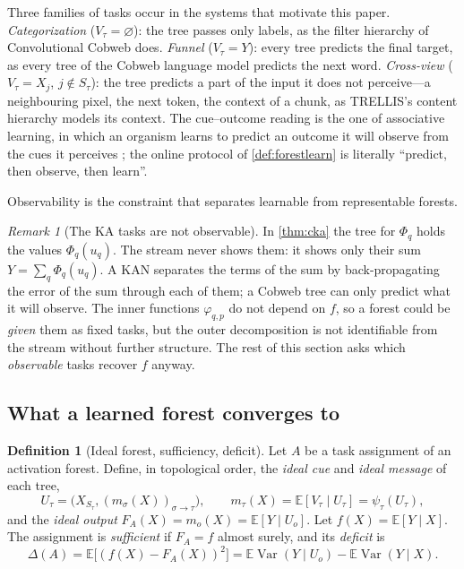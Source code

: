 \documentclass[11pt]{article}
\theoremstyle{definition}
\newtheorem{definition}[theorem]{Definition}
\theoremstyle{remark}
\newtheorem{remark}[theorem]{Remark}
\newcommand{\E}{\mathbb{E}}
\newcommand{\Var}{\operatorname{Var}}
\begin{document}
Three families of tasks occur in the systems that motivate this paper.
\emph{Categorization} ($V_\tau=\varnothing$): the tree passes only labels, as the filter
hierarchy of Convolutional Cobweb does.  \emph{Funnel} ($V_\tau=Y$): every tree predicts
the final target, as every tree of the Cobweb language model predicts the next word.
\emph{Cross-view} ($V_\tau=X_j$, $j\notin S_\tau$): the tree predicts a part of the input
it does not perceive---a neighbouring pixel, the next token, the context of a chunk, as
TRELLIS's content hierarchy models its context.  The cue--outcome reading is the one of
associative learning, in which an organism learns to predict an outcome it will observe
from the cues it perceives \citep{rescorla1972}; the online protocol of
\cref{def:forestlearn} is literally ``predict, then observe, then learn''.

Observability is the constraint that separates learnable from representable forests.

\begin{remark}[The KA tasks are not observable]\label{rem:kaobs}
In \cref{thm:cka} the tree for $\Phi_q$ holds the values $\Phi_q(u_q)$.  The stream
never shows them: it shows only their sum $Y=\sum_q\Phi_q(u_q)$.  A KAN separates the
terms of the sum by back-propagating the error of the sum through each of them; a Cobweb
tree can only predict what it will observe.  The inner functions $\varphi_{q,p}$ do not
depend on $f$, so a forest could be \emph{given} them as fixed tasks, but the outer
decomposition is not identifiable from the stream without further structure.  The rest
of this section asks which \emph{observable} tasks recover $f$ anyway.
\end{remark}

\subsection{What a learned forest converges to}

\begin{definition}[Ideal forest, sufficiency, deficit]\label{def:ideal}
Let $A$ be a task assignment of an activation forest.  Define, in topological order,
the \emph{ideal cue} and \emph{ideal message} of each tree,
\[
  U_\tau=\bigl(X_{S_\tau},(m_\sigma(X))_{\sigma\to\tau}\bigr),\qquad
  m_\tau(X)=\E[V_\tau\mid U_\tau]=\psi_\tau(U_\tau),
\]
and the \emph{ideal output} $F_A(X)=m_o(X)=\E[Y\mid U_o]$.  Let $f(X)=\E[Y\mid X]$.  The
assignment is \emph{sufficient} if $F_A=f$ almost surely, and its \emph{deficit} is
\[
  \Delta(A)=\E\bigl[(f(X)-F_A(X))^2\bigr]=\E\Var(Y\mid U_o)-\E\Var(Y\mid X).
\]
\end{definition}
\end{document}
